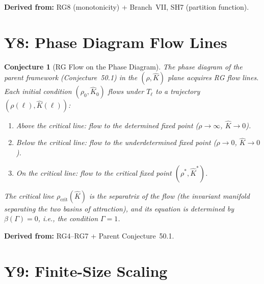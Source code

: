 \documentclass[11pt,letterpaper]{article}
\newtheorem{conjecture}{Conjecture}[section]
\newcommand{\Khat}{\hat{K}}
\begin{document}
\textbf{Derived from:} RG8 (monotonicity) + Branch~VII, SH7 
(partition function).

\section{Y8: Phase Diagram Flow Lines}

\begin{conjecture}[RG Flow on the Phase 
Diagram]\label{conj:flow_lines}
The phase diagram of the parent framework (Conjecture~50.1) in the 
$(\rho, \Khat)$ plane acquires RG flow lines. Each initial 
condition $(\rho_0, \Khat_0)$ flows under $T_\ell$ to a trajectory 
$(\rho(\ell), \Khat(\ell))$:

\begin{enumerate}[label=(\alph*)]
    \item Above the critical line: flow to the determined fixed 
    point ($\rho \to \infty$, $\Khat \to 0$).
    
    \item Below the critical line: flow to the underdetermined 
    fixed point ($\rho \to 0$, $\Khat \to 0$).
    
    \item On the critical line: flow to the critical fixed point 
    $(\rho^*, \Khat^*)$.
\end{enumerate}

The critical line $\rho_{\mathrm{crit}}(\Khat)$ is the 
\emph{separatrix} of the flow (the invariant manifold separating 
the two basins of attraction), and its equation is determined by 
$\beta(\Gamma) = 0$, i.e., the condition $\Gamma = 1$.
\end{conjecture}

\textbf{Derived from:} RG4--RG7 + Parent Conjecture~50.1.

\section{Y9: Finite-Size Scaling}
\end{document}
